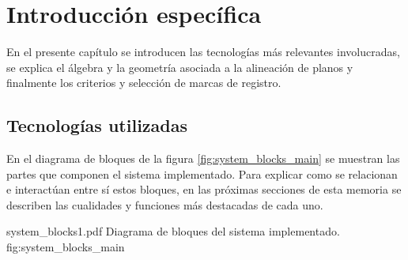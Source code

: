 \chapter{Introducción específica} %

\label{Chapter2}

En el presente capítulo se introducen las tecnologías más relevantes involucradas, se explica el álgebra y la geometría asociada a la alineación de planos y finalmente los criterios y selección de marcas de registro.

\section{Tecnologías utilizadas}
\label{section:tecnologias_utilizadas}
   En el diagrama de bloques de la figura \ref{fig:system_blocks_main} se muestran las partes que componen el sistema implementado.
   Para explicar como se relacionan e interactúan entre sí estos bloques, en las próximas secciones de esta memoria se describen las cualidades y funciones más destacadas de cada uno.

         {system_blocks1.pdf}
         {Diagrama de bloques del sistema implementado.}
         {fig:system_blocks_main}

